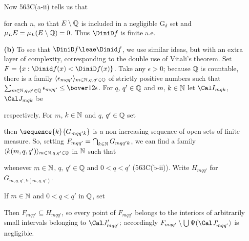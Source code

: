 {

\noindent Now 563C(a-ii) tells us that


\noindent for each $n$, so that
$E\setminus\Bbb Q$ is included in a negligible G$_{\delta}$ set and
$\mu_L E=\mu_L(E\setminus\Bbb Q)=0$.   Thus $\DiniD f$ is finite a.e.

\medskip

{\bf (b)} To see that $\DiniD f\leae\Dinid f$, we use similar ideas, but with
an extra layer of complexity, corresponding to the double use of
Vitali's theorem.   Set $F=\{x:\Dinid f(x)<\DiniD f(x)\}$.   Take any
$\epsilon>0$;  because $\Bbb Q$ is countable, there is a family
$\langle\epsilon_{mqq'}\rangle_{m\in\Bbb N,q,q'\in\Bbb Q}$
of strictly positive numbers such that
$\sum_{m\in\Bbb N,q,q'\in\Bbb Q}\epsilon_{mqq'}\le\bover12\epsilon$.
For $q$, $q'\in\Bbb Q$ and $m$, $k\in\Bbb N$ let $\Cal I_{mqk}$,
$\Cal J_{mqk}$ be



\noindent respectively.  For $m$, $k\in\Bbb N$ and $q$, $q'\in\Bbb Q$ set


\noindent then $\sequence{k}{G_{mqq'k}}$ is a
non-increasing sequence of open sets of finite measure.
So, setting $F_{mqq'}=\bigcap_{k\in\Bbb N}G_{mqq'k}$, we can find a family
$\langle k(m,q,q')\rangle_{m\in\Bbb N,q,q'\in\Bbb Q}$ in $\Bbb N$ such that


\noindent whenever $m\in\Bbb N$, $q$,
$q'\in\Bbb Q$ and $0<q<q'$ (563C(b-ii)).   Write $H_{mqq'}$ for
$G_{m,q,q',k(m,q,q')}$.

If $m\in\Bbb N$ and $0<q<q'$ in $\Bbb Q$, set


\noindent Then $F_{mqq'}\subseteq H_{mqq'}$,
so every point of $F_{mqq'}$ belongs to the interiors of arbitrarily small
intervals belonging to $\Cal J'_{mqq'}$;  accordingly
$F_{mqq'}\setminus\bigcup\Psi(\Cal J'_{mqq'})$ is negligible.

}
